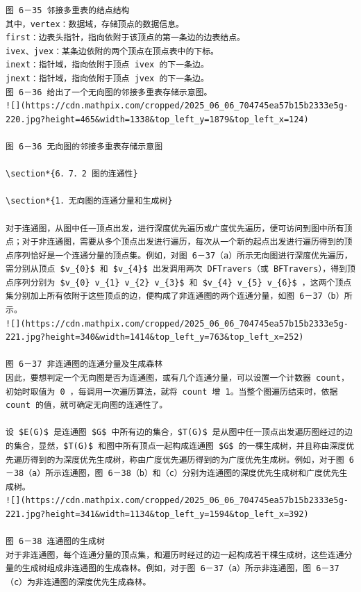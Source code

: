 \documentclass[10pt]{article}
\begin{document}
\begin{verbatim}
图 6－35 邻接多重表的结点结构
其中，vertex：数据域，存储顶点的数据信息。
first：边表头指针，指向依附于该顶点的第一条边的边表结点。
ivex、jvex：某条边依附的两个顶点在顶点表中的下标。
inext：指针域，指向依附于顶点 ivex 的下一条边。
jnext：指针域，指向依附于顶点 jvex 的下一条边。
图 6－36 给出了一个无向图的邻接多重表存储示意图。
![](https://cdn.mathpix.com/cropped/2025_06_06_704745ea57b15b2333e5g-220.jpg?height=465&width=1338&top_left_y=1879&top_left_x=124)

图 6－36 无向图的邻接多重表存储示意图

\section*{6．7．2 图的连通性}

\section*{1．无向图的连通分量和生成树}

对于连通图，从图中任一顶点出发，进行深度优先遍历或广度优先遍历，便可访问到图中所有顶点；对于非连通图，需要从多个顶点出发进行遍历，每次从一个新的起点出发进行遍历得到的顶点序列恰好是一个连通分量的顶点集。例如，对图 6－37（a）所示无向图进行深度优先遍历，需分别从顶点 $v_{0}$ 和 $v_{4}$ 出发调用两次 DFTravers（或 BFTravers），得到顶点序列分别为 $v_{0} v_{1} v_{2} v_{3}$ 和 $v_{4} v_{5} v_{6}$ ，这两个顶点集分别加上所有依附于这些顶点的边，便构成了非连通图的两个连通分量，如图 6－37（b）所示。
![](https://cdn.mathpix.com/cropped/2025_06_06_704745ea57b15b2333e5g-221.jpg?height=340&width=1414&top_left_y=763&top_left_x=252)

图 6－37 非连通图的连通分量及生成森林
因此，要想判定一个无向图是否为连通图，或有几个连通分量，可以设置一个计数器 count，初始时取值为 0 ，每调用一次遍历算法，就将 count 增 1。当整个图遍历结束时，依据 count 的值，就可确定无向图的连通性了。

设 $E(G)$ 是连通图 $G$ 中所有边的集合，$T(G)$ 是从图中任一顶点出发遍历图经过的边的集合，显然，$T(G)$ 和图中所有顶点一起构成连通图 $G$ 的一棵生成树，并且称由深度优先遍历得到的为深度优先生成树，称由广度优先遍历得到的为广度优先生成树。例如，对于图 6－38（a）所示连通图，图 6－38（b）和（c）分别为连通图的深度优先生成树和广度优先生成树。
![](https://cdn.mathpix.com/cropped/2025_06_06_704745ea57b15b2333e5g-221.jpg?height=341&width=1134&top_left_y=1594&top_left_x=392)

图 6－38 连通图的生成树
对于非连通图，每个连通分量的顶点集，和遍历时经过的边一起构成若干棵生成树，这些连通分量的生成树组成非连通图的生成森林。例如，对于图 6－37（a）所示非连通图，图 6－37（c）为非连通图的深度优先生成森林。


\end{verbatim}
\end{document}

